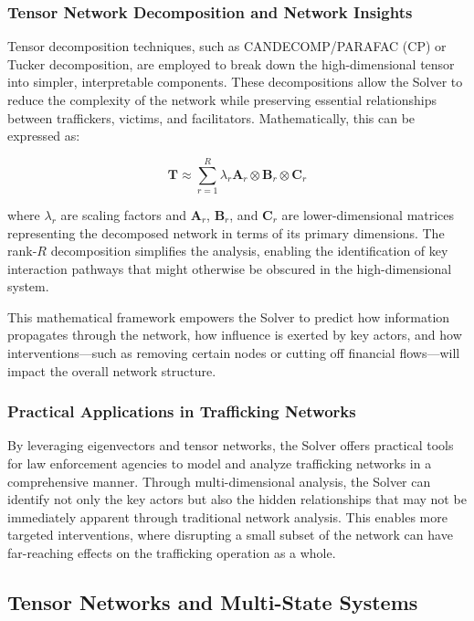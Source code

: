 \documentclass[%
 preprint, linenumbers,
 amsmath,amssymb,
 aps, physrev,
]{revtex4-2}
\begin{document}
\subsubsection{Tensor Network Decomposition and Network Insights}

Tensor decomposition techniques, such as CANDECOMP/PARAFAC (CP) or Tucker decomposition, are employed to break down the high-dimensional tensor into simpler, interpretable components. These decompositions allow the Solver to reduce the complexity of the network while preserving essential relationships between traffickers, victims, and facilitators. Mathematically, this can be expressed as:

\[
\mathbf{T} \approx \sum_{r=1}^{R} \lambda_r \mathbf{A}_r \otimes \mathbf{B}_r \otimes \mathbf{C}_r
\]

where \(\lambda_r\) are scaling factors and \(\mathbf{A}_r\), \(\mathbf{B}_r\), and \(\mathbf{C}_r\) are lower-dimensional matrices representing the decomposed network in terms of its primary dimensions. The rank-\(R\) decomposition simplifies the analysis, enabling the identification of key interaction pathways that might otherwise be obscured in the high-dimensional system.

This mathematical framework empowers the Solver to predict how information propagates through the network, how influence is exerted by key actors, and how interventions—such as removing certain nodes or cutting off financial flows—will impact the overall network structure.

\subsubsection{Practical Applications in Trafficking Networks}

By leveraging eigenvectors and tensor networks, the Solver offers practical tools for law enforcement agencies to model and analyze trafficking networks in a comprehensive manner. Through multi-dimensional analysis, the Solver can identify not only the key actors but also the hidden relationships that may not be immediately apparent through traditional network analysis. This enables more targeted interventions, where disrupting a small subset of the network can have far-reaching effects on the trafficking operation as a whole.

\subsection{Tensor Networks and Multi-State Systems}
\end{document}
